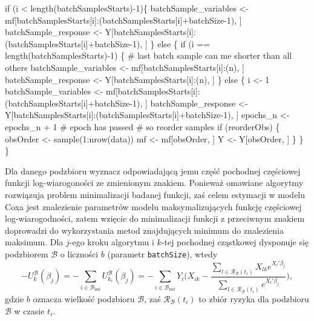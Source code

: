 \documentclass[]{article}
\newenvironment{Shaded}{}{}
\newcommand{\KeywordTok}[1]{\textcolor[rgb]{0.00,0.00,1.00}{{#1}}}
\newcommand{\DecValTok}[1]{{#1}}
\newcommand{\StringTok}[1]{\textcolor[rgb]{0.00,0.50,0.50}{{#1}}}
\newcommand{\CommentTok}[1]{\textcolor[rgb]{0.00,0.50,0.00}{{#1}}}
\newcommand{\NormalTok}[1]{{#1}}
\begin{document}
\begin{Shaded}
\begin{Highlighting}[]
  \NormalTok{if (i <}\StringTok{ }\KeywordTok{length}\NormalTok{(batchSamplesStarts)-}\DecValTok{1}\NormalTok{)\{}
    \NormalTok{batchSample_variables <-}\StringTok{ }\NormalTok{mf[batchSamplesStarts[i]:(batchSamplesStarts[i]+batchSize}\DecValTok{-1}\NormalTok{), ]}
    \NormalTok{batchSample_response <-}\StringTok{ }\NormalTok{Y[batchSamplesStarts[i]:(batchSamplesStarts[i]+batchSize}\DecValTok{-1}\NormalTok{), ]}
  \NormalTok{\} else \{}
    \NormalTok{if (i ==}\StringTok{ }\KeywordTok{length}\NormalTok{(batchSamplesStarts)-}\DecValTok{1}\NormalTok{) \{}
      \CommentTok{# last batch sample can me shorter than all others}
      \NormalTok{batchSample_variables <-}\StringTok{ }\NormalTok{mf[batchSamplesStarts[i]:(n), ]}
      \NormalTok{batchSample_response <-}\StringTok{ }\NormalTok{Y[batchSamplesStarts[i]:(n), ]}
    \NormalTok{\} else \{}
      \NormalTok{i <-}\StringTok{ }\DecValTok{1}
      \NormalTok{batchSample_variables <-}\StringTok{ }\NormalTok{mf[batchSamplesStarts[i]:(batchSamplesStarts[i]+batchSize}\DecValTok{-1}\NormalTok{), ]}
      \NormalTok{batchSample_response <-}\StringTok{ }\NormalTok{Y[batchSamplesStarts[i]:(batchSamplesStarts[i]+batchSize}\DecValTok{-1}\NormalTok{), ]}
      \NormalTok{epochs_n <-}\StringTok{ }\NormalTok{epochs_n +}\StringTok{ }\DecValTok{1} \CommentTok{# epoch has passed}
      \CommentTok{# so reorder samples}
        \NormalTok{if (reorderObs) \{}
          \NormalTok{obsOrder <-}\StringTok{ }\KeywordTok{sample}\NormalTok{(}\DecValTok{1}\NormalTok{:}\KeywordTok{nrow}\NormalTok{(data))}
          \NormalTok{mf <-}\StringTok{ }\NormalTok{mf[obsOrder, ]}
          \NormalTok{Y <-}\StringTok{ }\NormalTok{Y[obsOrder, ]}
        \NormalTok{\}}
    \NormalTok{\}}
  \NormalTok{\}}
\end{Highlighting}
\end{Shaded}

Dla danego podzbioru wyznacz odpowiadającą jemu część pochodnej
częściowej funkcji log-wiarogoności ze zmienionym znakiem. Ponieważ
omawiane algorytmy rozwiązuja problem minimalizacji badanej funkcji, zaś
celem estymacji w modelu Coxa jest znalezienie parametrów modelu
maksymalizujących funkcję częściowej log-wiarogodności, zatem wzięcie do
minimalizacji funkcji z przeciwnym znakiem doprowadzi do wykorzystania
metod znajdujących minimum do znalezienia maksimum. Dla \(j\)-ego kroku
algorytmu i \(k\)-tej pochodnej cząstkowej dysponuje się podzbiorem
\(\mathcal{B}\) o liczności \(b\) (parametr \texttt{batchSize}), wtedy
\[-U^\mathcal{B}_k(\beta_j)=-\sum\limits_{i \in \mathcal{B}_\text{ind}}^{}U^\mathcal{B}_{k_{i}}(\beta_j)=-\sum\limits_{i \in \mathcal{B}_\text{ind}}^{}Y_i\Big(X_{ik}-\dfrac{\sum\limits_{l\in \mathscr{R}_\mathcal{B}(t_i)}^{} X_{lk} e^{X_l'\beta_j}}{\sum\limits_{l\in \mathscr{R}_\mathcal{B}(t_i)}^{} e^{X_l'\beta_j}}\Big),\]
gdzie \(b\) oznacza wielkość podzbioru \(\mathcal{B}\), zaś
\(\mathscr{R}_\mathcal{B}(t_i)\) to zbiór ryzyka dla podzbioru
\(\mathcal{B}\) w czasie \(t_i\).
\end{document}
